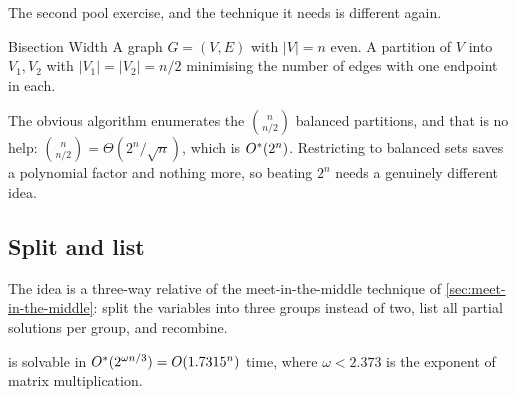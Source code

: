 The second pool exercise, and the technique it needs is different again.

\begin{probdef}{Bisection Width}
  \instance A graph $G = (V,E)$ with $|V| = n$ even.
  \goal A partition of $V$ into $V_1, V_2$ with $|V_1| = |V_2| = n/2$
  minimising the number of edges with one endpoint in each.
\end{probdef}

The obvious algorithm enumerates the $\binom{n}{n/2}$ balanced partitions, and
that is no help: $\binom{n}{n/2} = \Theta(2^n/\sqrt n)$, which is $O^{*}(2^n)$.
Restricting to balanced sets saves a polynomial factor and nothing more, so
beating $2^n$ needs a genuinely different idea.

\subsection{Split and list}

The idea is a three-way relative of the meet-in-the-middle technique of
\cref{sec:meet-in-the-middle}: split the variables into three groups instead of
two, list all partial solutions per group, and recombine.

\begin{theorem}\label{thm:bisection}
 is solvable in $O^{*}(2^{\omega n/3}) =
O\!\left(1.7315^n\right)$ time, where $\omega < 2.373$ is the exponent of matrix
multiplication.
\end{theorem}

